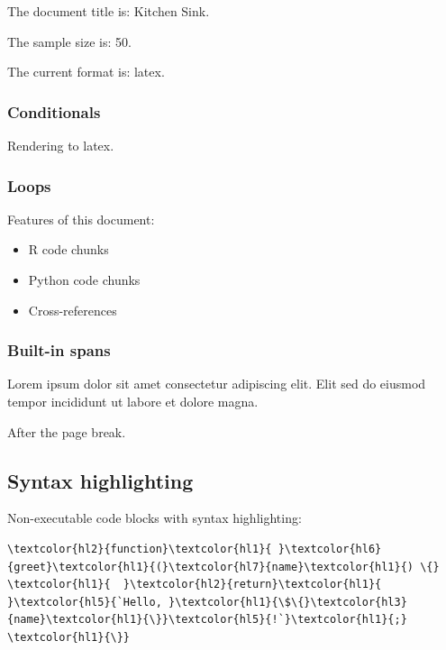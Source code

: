 \documentclass[11pt]{article}
\begin{document}
The document title is: Kitchen Sink.

The sample size is: 50.

The current format is: latex.

\subsubsection{Conditionals}
\label{conditionals}

Rendering to latex.

\subsubsection{Loops}
\label{loops}

Features of this document:

\begin{itemize}
\item R code chunks


\item Python code chunks


\item Cross-references


\end{itemize}

\subsubsection{Built-in spans}
\label{built-in-spans}

Lorem ipsum dolor sit amet consectetur adipiscing elit. Elit sed do eiusmod tempor incididunt ut labore et dolore magna.

\newpage{}

After the page break.

\subsection{Syntax highlighting}
\label{syntax-highlighting}

Non-executable code blocks with syntax highlighting:




\begin{srccode}
\begin{Verbatim}[commandchars=\\\{\}]
\textcolor{hl2}{function}\textcolor{hl1}{ }\textcolor{hl6}{greet}\textcolor{hl1}{(}\textcolor{hl7}{name}\textcolor{hl1}{) \{}
\textcolor{hl1}{  }\textcolor{hl2}{return}\textcolor{hl1}{ }\textcolor{hl5}{`Hello, }\textcolor{hl1}{\$\{}\textcolor{hl3}{name}\textcolor{hl1}{\}}\textcolor{hl5}{!`}\textcolor{hl1}{;}
\textcolor{hl1}{\}}
\end{Verbatim}
\end{srccode}
\end{document}
